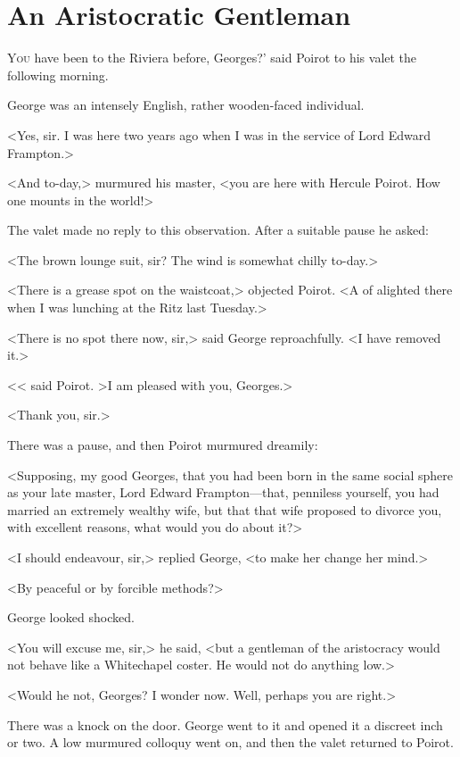 \chapter{An Aristocratic Gentleman}



\lettrine[ante=`]{Y}{ou}  have been to the Riviera before, Georges?' said Poirot to his valet the following morning.

\zz
George was an intensely English, rather wooden-faced individual.

\zz
<Yes, sir. I was here two years ago when I was in the service of Lord Edward Frampton.>

<And to-day,> murmured his master, <you are here with Hercule Poirot. How one mounts in the world!>

The valet made no reply to this observation. After a suitable pause he asked:

<The brown lounge suit, sir? The wind is somewhat chilly to-day.>

<There is a grease spot on the waistcoat,> objected Poirot. <A  of  alighted there when I was lunching at the Ritz last Tuesday.>

<There is no spot there now, sir,> said George reproachfully. <I have removed it.>

<< said Poirot. >I am pleased with you, Georges.>

<Thank you, sir.>

There was a pause, and then Poirot murmured dreamily:

<Supposing, my good Georges, that you had been born in the same social sphere as your late master, Lord Edward Frampton—that, penniless yourself, you had married an extremely wealthy wife, but that that wife proposed to divorce you, with excellent reasons, what would you do about it?>

<I should endeavour, sir,> replied George, <to make her change her mind.>

<By peaceful or by forcible methods?>

George looked shocked.

<You will excuse me, sir,> he said, <but a gentleman of the aristocracy would not behave like a Whitechapel coster. He would not do anything low.>

<Would he not, Georges? I wonder now. Well, perhaps you are right.>

There was a knock on the door. George went to it and opened it a discreet inch or two. A low murmured colloquy went on, and then the valet returned to Poirot.

